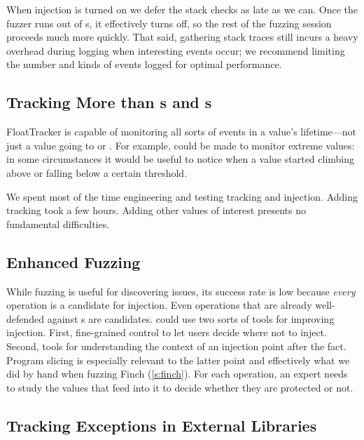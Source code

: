 \documentclass{juliacon}
\begin{document}
When injection is turned on we defer the stack checks as late as we can.
Once the fuzzer runs out of \NaN{}s, it effectively turns off, so the rest of the fuzzing session proceeds much more quickly.
That said, gathering stack traces still incurs a heavy overhead during logging when interesting events occur;
we recommend limiting the number and kinds of events logged for optimal performance.

\subsection{Tracking More than \NaN{}s and \Inf{}s}

FloatTracker is capable of monitoring all sorts of events in a \fp{} value's lifetime---not just a value going to \NaN{} or \Inf{}.
For example, \FT{} could be made to monitor extreme values: in some circumstances it would be useful to notice when a value started climbing above or falling below a certain threshold.

We spent most of the time engineering and testing \NaN{} tracking and injection.
Adding \Inf{} tracking took a few hours.
Adding other values of interest presents no fundamental difficulties.

\subsection{Enhanced Fuzzing}

While fuzzing is useful for discovering issues, its success rate
is low because \emph{every} \fp{} operation is a candidate
for injection.
Even operations that are already well-defended against \NaN{}s are candidates.
\FT{} could use two sorts of tools for improving injection.
First, fine-grained control to let users decide where not to inject.
Second, tools for understanding the context of an injection point
after the fact.
Program slicing is especially relevant to the latter point and effectively
what we did by hand when fuzzing Finch (\cref{s:finch}).
For each operation, an expert needs to study the values that feed into it to
decide whether they are protected or not.


\subsection{Tracking Exceptions in External Libraries}
\end{document}
